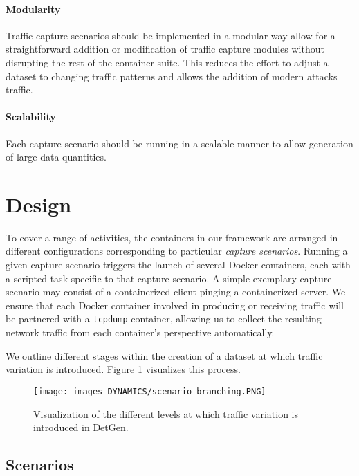 \paragraph{Modularity} Traffic capture scenarios should be implemented in a modular way allow for a straightforward addition or modification of traffic capture modules without disrupting the rest of the container suite. This reduces the effort to adjust a dataset to changing traffic patterns and allows the addition of modern attacks traffic.

\paragraph{Scalability} Each capture scenario should be running in a scalable manner to allow generation of large data quantities.



\section{Design}\label{SecD:Design}

To cover a range of activities, the containers in our framework are arranged in different configurations corresponding to particular \emph{capture scenarios}. Running a given capture scenario triggers the launch of several Docker containers, each with a scripted task specific to that capture scenario. A simple exemplary capture scenario may consist of a containerized client pinging a containerized server. We ensure that each Docker container involved in producing or receiving traffic will be partnered with a \texttt{tcpdump} container, allowing us to collect the resulting network traffic from each container's perspective automatically. 

We outline different stages within the creation of a dataset at which traffic variation is introduced. Figure \ref{figD:branching} visualizes this process.


\begin{figure}
 \centering 
 \texttt{[image: images\_DYNAMICS/scenario\_branching.PNG]}
 \caption{Visualization of the different levels at which traffic variation is introduced in DetGen.}
 \label{figD:branching}
\end{figure}


\subsection{Scenarios}
\label{SecD:Scenarios}

